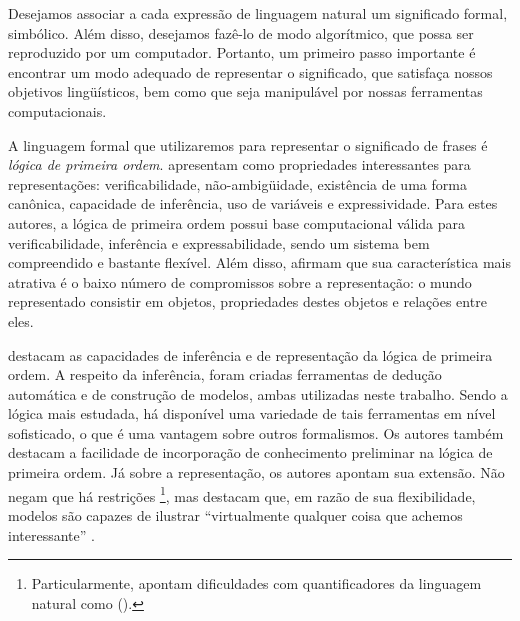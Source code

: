 


%
Desejamos associar a cada expressão de linguagem natural um significado formal, simbólico. Além disso, desejamos fazê-lo de modo algorítmico, que possa ser reproduzido por um computador. Portanto, um primeiro passo importante é encontrar um modo adequado de representar o significado, que satisfaça nossos objetivos lingüísticos, bem como que seja manipulável por nossas ferramentas computacionais.

A linguagem formal que utilizaremos para representar o significado de frases é \textit{lógica de primeira ordem}. \citet[pp.~500--506]{Jurafsky:2009} apresentam como propriedades interessantes para representações: verificabilidade, não-ambigüidade, existência de uma forma canônica, capacidade de inferência, uso de variáveis e expressividade. Para estes autores, a lógica de primeira ordem possui base computacional válida para verificabilidade, inferência e expressabilidade, sendo um sistema bem compreendido e bastante flexível. Além disso, afirmam que sua característica mais atrativa é o baixo número de compromissos sobre a representação: o mundo representado consistir em objetos, propriedades destes objetos e relações entre eles. \citep[p.~509]{Jurafsky:2009}

\citet[pp.~44--50]{BlackburnBos:2005} destacam as capacidades de inferência e de representação da lógica de primeira ordem. A respeito da inferência, foram criadas ferramentas de dedução automática e de construção de modelos, ambas utilizadas neste trabalho. Sendo a lógica mais estudada, há disponível uma variedade de tais ferramentas em nível sofisticado, o que é uma vantagem sobre outros formalismos. Os autores também destacam a facilidade de incorporação de conhecimento preliminar na lógica de primeira ordem. Já sobre a representação, os autores apontam sua extensão. Não negam que há restrições%
	\footnote{Particularmente, apontam dificuldades com quantificadores da linguagem natural como  ().}, 
mas destacam que, em razão de sua flexibilidade, modelos são capazes de ilustrar ``virtualmente qualquer coisa que achemos interessante'' \citep[p.~48]{BlackburnBos:2005}.

